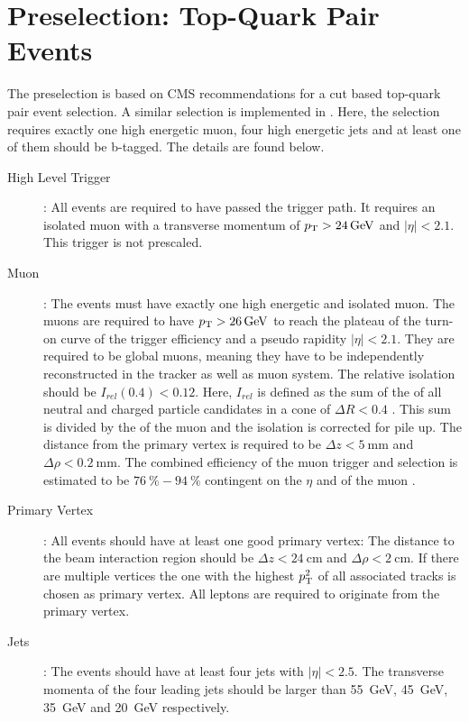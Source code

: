 \section{Preselection: Top-Quark Pair Events}
\label{sec_ttg_presel}

The preselection is based on CMS recommendations for a cut based top-quark pair event selection. A similar selection is implemented in \cite{CMS-PAS-TOP-12-027}. Here, the selection requires exactly one high energetic muon, four high energetic jets and at least one of them should be b-tagged. The details are found below.

\begin{description}
\item[High Level Trigger]: All events are required to have passed the  trigger path. It requires an isolated muon with a transverse momentum of $p_{\mathrm{T}} > \SI{24}{\giga \electronvolt}$ and $| \eta | < 2.1$. This trigger is not prescaled.
\item[Muon]: The events must have exactly one high energetic and isolated muon. The muons are required to have  $p_{\mathrm{T}} > \SI{26}{\giga \electronvolt}$ to reach the plateau of the turn-on curve of the trigger efficiency and a pseudo rapidity $| \eta | <2.1 $. They are required to be global muons, meaning they have to be independently reconstructed in the tracker as well as muon system. The relative isolation should be $I_{rel}(0.4) < 0.12$. Here, $I_{rel}$ is defined as the sum of the \pt of all neutral and charged particle candidates in a cone of $\Delta R < 0.4$ . This sum is divided by the \pt of the muon and the isolation is corrected for pile up. The distance from the primary vertex is required to be $\Delta z < \SI{5}{\milli \meter}$ and $\Delta \rho < \SI{0.2}{\milli \meter}$. The combined efficiency of the muon trigger and selection is estimated to be $\SI{76}{\percent}-\SI{94}{\percent}$ contingent on the $\eta$ and \pt of the muon \cite{CMS-DP-2013-009,Chatrchyan:2012xi}.
\item[Primary Vertex]: All events should have at least one good primary vertex: The distance to the beam interaction region should be $\Delta z < \SI{24}{\centi \meter}$ and $\Delta \rho < \SI{2}{\centi \meter}$. If there are multiple vertices the one with the highest $p_{\mathrm{T}}^2$ of all associated tracks is chosen as primary vertex. All leptons are required to originate from the primary vertex.
\item[Jets]: The events should have at least four jets with $| \eta | < 2.5$. The transverse momenta of the four leading jets should be larger than \SI{55}{\giga \electronvolt}, \SI{45}{\giga \electronvolt}, \SI{35}{\giga \electronvolt} and \SI{20}{\giga \electronvolt} respectively. 

\end{description}
